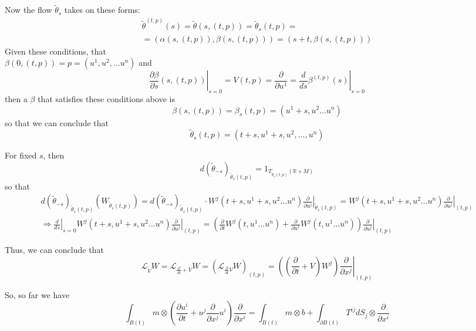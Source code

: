 \documentclass[twoside,landscape,10pt]{amsart}
\theoremstyle{plain}
\theoremstyle{definition}
\theoremstyle{remark}
\begin{document}
\begin{multicols*}{2}
Now the flow $\widetilde{\theta}_s$ takes on these forms:
\[
\begin{gathered}
  \widetilde{\theta}^{(t,p)}(s) = \widetilde{\theta}(s,(t,p)) = \widetilde{\theta}_s(t,p) = \\
  = (\alpha(s,(t,p)) , \beta(s,(t,p))) = (s+t, \beta(s,(t,p)) )
\end{gathered}
\]
Given these conditions, that \\
$\beta(0,(t,p)) = p = (u^1,u^2, \dots u^n)$ and 
\[
\left. \frac{ \partial \beta}{ \partial s}(s, (t,p)) \right|_{s=0} = V(t,p) = \frac{ \partial }{ \partial u^1} = \left. \frac{d}{ds} \beta^{(t,p)}(s) \right|_{s=0}
\]
then a $\beta$ that satisfies these conditions above is 
\[
\beta(s,(t,p)) = \beta_s(t,p) = (u^1 + s, u^2 \dots u^n)
\]
so that we can conclude that 
\[
\widetilde{\theta}_s(t,p) = (t+s, u^1 + s, u^2 , \dots , u^n)
\]

For fixed $s$, then
\[
d(\widetilde{\theta}_{-s})_{\widetilde{\theta}_s(t,p)} =1_{T_{\widetilde{\theta}_s(t,p)}(\mathbb{R}\times M)}
\]
so that 
\[
\begin{gathered}
  d(\widetilde{\theta}_{-s})_{\widetilde{\theta}_s(t,p)}(W_{\widetilde{\theta}_s(t,p)}) = d(\widetilde{\theta}_{-s})_{\widetilde{\theta}_s(t,p)} \cdot W^j(t+s,u^1 +s, u^2 \dots u^n) \left. \frac{ \partial }{ \partial u^j} \right|_{\widetilde{\theta}_s(t,p)} = W^j(t+s,u^1+s, u^2 \dots u^n) \left. \frac{ \partial }{ \partial u^j} \right|_{(t,p)} \\
\Longrightarrow \left. \frac{d}{ds} \right|_{s=0} W^j(t+s,u^1+s, u^2 \dots u^n) \left. \frac{ \partial }{ \partial u^j} \right|_{(t,p)} = \left( \frac{\partial }{ \partial t} W^j(t,u^1 \dots u^n) + \frac{ \partial }{ \partial u^1 } W^j(t,u^1 \dots u^n) \right) \left. \frac{ \partial}{ \partial u^j} \right|_{(t,p)}
\end{gathered}
\]


Thus, we can conclude that 
\begin{equation}
  \boxed{ \mathcal{L}_{\widetilde{V}}W = \mathcal{L}_{ \frac{ \partial }{ \partial t} +V}W = \left( \mathcal{L}_{ \frac{ \partial}{ \partial t} V } W \right)_{(t,p)} = \left( \left( \frac{ \partial }{ \partial t} + V \right) W^j \right) \left. \frac{ \partial }{ \partial x^j} \right|_{(t,p)} }
\end{equation}
 

So, so far we have
\begin{equation}
  \boxed{ \int_{B(t)} m \otimes \left( \frac{ \partial u^i}{ \partial t} + u^j \frac{ \partial }{ \partial x^j} u^i \right)\frac{ \partial }{ \partial x^i} = \int_{B(t)} m\otimes b + \int_{\partial B(t)} T^{ij} dS_j \otimes \frac{\partial}{ \partial x^i} }
\end{equation}


\end{multicols*}
\end{document}
